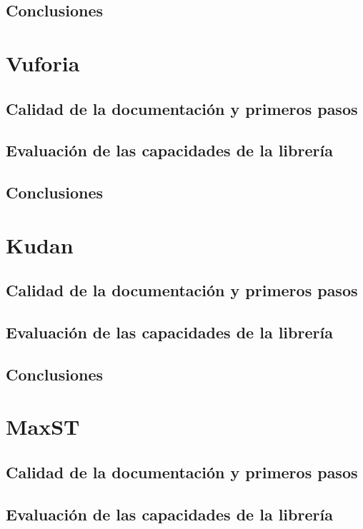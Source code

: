 \subsection{Conclusiones}
\lipsum[1]

\section{Vuforia}
\subsection{Calidad de la documentación y primeros pasos}
\lipsum[1]
\subsection{Evaluación de las capacidades de la librería}
\lipsum[1]
\subsection{Conclusiones}
\lipsum[1]

\section{Kudan}
\subsection{Calidad de la documentación y primeros pasos}
\lipsum[1]
\subsection{Evaluación de las capacidades de la librería}
\lipsum[1]
\subsection{Conclusiones}
\lipsum[1]

\section{MaxST}
\subsection{Calidad de la documentación y primeros pasos}
\lipsum[1]
\subsection{Evaluación de las capacidades de la librería}
\lipsum[1]
